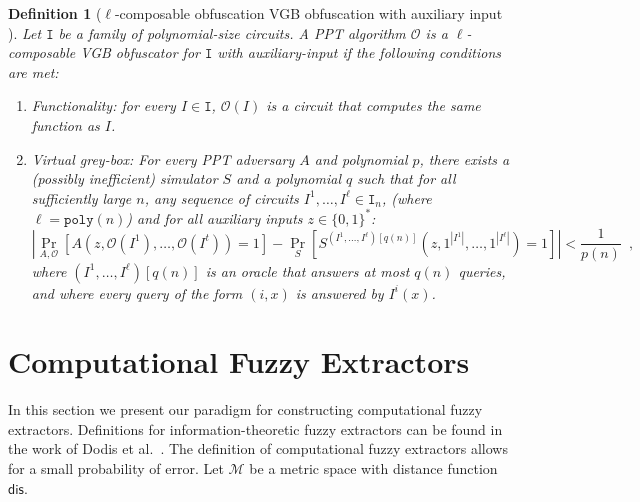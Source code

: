 \documentclass[11pt]{article}
\newcommand{\zo}{\ensuremath{\{0, 1\}}}
\newcommand{\dis}{\ensuremath{\mathsf{dis}}}
\newcommand{\poly}{\ensuremath{\mathtt{poly}}\xspace}
\newtheorem{definition}[theorem]{Definition}
\begin{document}
\begin{definition}[$\ell$-composable obfuscation VGB obfuscation with auxiliary input \cite{bitansky2010strong}]
\label{def:obf} Let $\mathtt{I}$ be a family of polynomial-size circuits.  A PPT algorithm $\mathcal{O}$ is a $\ell$-composable VGB obfuscator for $\mathtt{I}$ with auxiliary-input if the following conditions are met:
\begin{enumerate}
\item \emph{Functionality:} for every $ I \in \mathtt{I}$, $\mathcal{O}(I)$ is a circuit that computes the same function as $I$.
\item \emph{Virtual grey-box:}  For every PPT adversary $A$ and polynomial $p$, there exists a (possibly inefficient) simulator $S$ and a polynomial $q$ such that for all sufficiently large $n$, any  sequence of circuits $I^1,\dots,I^\ell \in \mathtt{I}_n$, (where $\ell=\poly(n)$) and for all auxiliary inputs $z\in \zo^*$:
\[
|\Pr_{A,\mathcal{O}}[A(z,\mathcal{O}(I^1),\dots,\mathcal{O}(I^t)) = 1] - \Pr_{S}[S^{(I^1,\dots,I^\ell)[q(n)]}(z, 1^{|I^1|},\dots,1^{|I^\ell|}) = 1] | < \frac{1}{p(n)} \enspace,
\]
where $(I^1,\dots,I^\ell)[q(n)]$ is an oracle that answers at most $q(n)$ queries, and where every query of the form $(i,x)$ is answered by $I^i(x)$.
\end{enumerate}
\end{definition}

\section{Computational Fuzzy Extractors}
\label{sec:fuzzy extractors}

In this section we present our paradigm for constructing computational fuzzy extractors.  Definitions for information-theoretic fuzzy extractors can be found in the work of Dodis et al.~\cite[Sections 2.5--4.1]{DBLP:journals/siamcomp/DodisORS08}.  The definition of computational fuzzy extractors allows for a small probability of error.  Let $\mathcal{M}$ be a metric space with distance function $\dis$.
\end{document}
